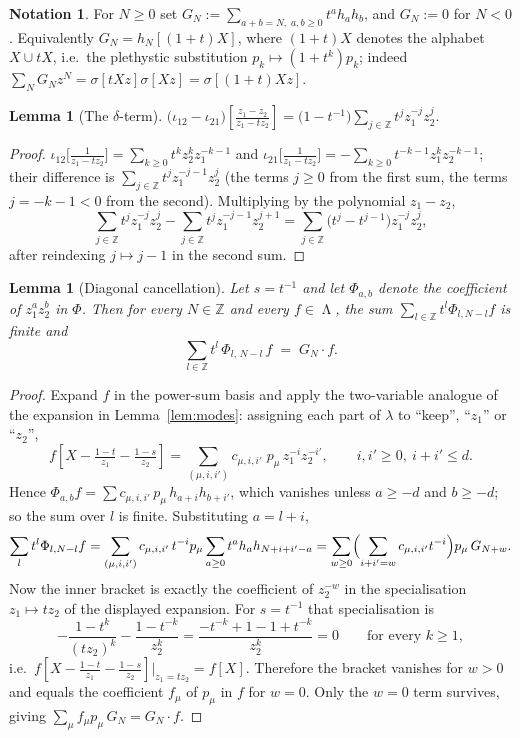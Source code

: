 \documentclass[11pt]{article}
\newtheorem{lemma}[theorem]{Lemma}
\theoremstyle{definition}
\newtheorem{notation}[theorem]{Notation}
\DeclareMathOperator{\Lam}{\Lambda}
\newcommand{\Z}{\mathbb{Z}}
\newcommand{\iotain}{\iota_{12}}
\newcommand{\iotaout}{\iota_{21}}
\begin{document}
\begin{notation}
For $N\ge0$ set $G_N:=\sum_{a+b=N,\;a,b\ge0}t^a h_a h_b$, and $G_N:=0$ for $N<0$. Equivalently
$G_N=h_N[(1+t)X]$, where $(1+t)X$ denotes the alphabet $X\cup tX$, i.e.\ the plethystic
substitution $p_k\mapsto(1+t^k)p_k$; indeed
$\sum_N G_Nz^N=\sigma[tXz]\sigma[Xz]=\sigma[(1+t)Xz]$.
\end{notation}

\begin{lemma}[The $\delta$-term]\label{lem:delta}
$\displaystyle
 \bigl(\iotain-\iotaout\bigr)\!\left[\frac{z_1-z_2}{z_1-t z_2}\right]
 =\bigl(1-t^{-1}\bigr)\sum_{j\in\Z}t^{j}z_1^{-j}z_2^{j}.
$
\end{lemma}

\begin{proof}
$\iotain\bigl[\tfrac{1}{z_1-tz_2}\bigr]=\sum_{k\ge0}t^kz_2^kz_1^{-k-1}$ and
$\iotaout\bigl[\tfrac{1}{z_1-tz_2}\bigr]=-\sum_{k\ge0}t^{-k-1}z_1^kz_2^{-k-1}$; their
difference is $\sum_{j\in\Z}t^jz_1^{-j-1}z_2^j$ (the terms $j\ge0$ from the first sum, the
terms $j=-k-1<0$ from the second). Multiplying by the polynomial $z_1-z_2$,
\[
  \sum_{j\in\Z}t^jz_1^{-j}z_2^j-\sum_{j\in\Z}t^jz_1^{-j-1}z_2^{j+1}
  =\sum_{j\in\Z}\bigl(t^j-t^{j-1}\bigr)z_1^{-j}z_2^{j},
\]
after reindexing $j\mapsto j-1$ in the second sum. \qedhere
\end{proof}

\begin{lemma}[Diagonal cancellation]\label{lem:diag}
Let $s=t^{-1}$ and let $\Phi_{a,b}$ denote the coefficient of $z_1^az_2^b$ in $\Phi$. Then for
every $N\in\Z$ and every $f\in\Lam$, the sum $\sum_{l\in\Z}t^{l}\Phi_{l,N-l}f$ is finite and
\[
  \sum_{l\in\Z}t^{l}\,\Phi_{l,\,N-l}\,f\;=\;G_N\cdot f .
\]
\end{lemma}

\begin{proof}
Expand $f$ in the power-sum basis and apply the two-variable analogue of the expansion in
Lemma~\ref{lem:modes}: assigning each part of $\lambda$ to ``keep'', ``$z_1$'' or ``$z_2$'',
\[
  f\!\left[X-\tfrac{1-t}{z_1}-\tfrac{1-s}{z_2}\right]
  =\sum_{(\mu,i,i')}c_{\mu,i,i'}\;p_\mu\,z_1^{-i}z_2^{-i'},
  \qquad i,i'\ge0,\ i+i'\le d .
\]
Hence $\Phi_{a,b}f=\sum c_{\mu,i,i'}\,p_\mu\,h_{a+i}h_{b+i'}$, which vanishes unless
$a\ge-d$ and $b\ge-d$; so the sum over $l$ is finite. Substituting $a=l+i$,
\[
  \sum_{l}t^l\Phi_{l,N-l}f
  =\sum_{(\mu,i,i')}c_{\mu,i,i'}\,t^{-i}p_\mu\sum_{a\ge0}t^{a}h_ah_{N+i+i'-a}
  =\sum_{w\ge0}\Bigl(\sum_{i+i'=w}c_{\mu,i,i'}t^{-i}\Bigr)p_\mu\,G_{N+w}.
\]
Now the inner bracket is exactly the coefficient of $z_2^{-w}$ in the specialisation
$z_1\mapsto tz_2$ of the displayed expansion. For $s=t^{-1}$ that specialisation is
\[
  -\frac{1-t^k}{(tz_2)^k}-\frac{1-t^{-k}}{z_2^{k}}
  =\frac{-t^{-k}+1-1+t^{-k}}{z_2^{k}}=0
  \qquad\text{for every }k\ge1,
\]
i.e.\ $f[X-\tfrac{1-t}{z_1}-\tfrac{1-s}{z_2}]\big|_{z_1=tz_2}=f[X]$. Therefore the bracket
vanishes for $w>0$ and equals the coefficient $f_\mu$ of $p_\mu$ in $f$ for $w=0$. Only the
$w=0$ term survives, giving $\sum_\mu f_\mu p_\mu\,G_N=G_N\cdot f$.
\end{proof}
\end{document}
